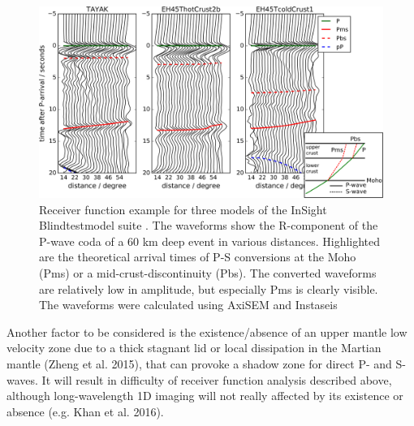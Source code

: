 \begin{figure}[h!]
\begin{center}
\includegraphics[width=1.0\textwidth]
{figures/Fig_waveforms.png}
\caption{Receiver function example for three models of the InSight Blindtestmodel suite \citep{Clinton2017}. The waveforms show the R-component of the P-wave coda of a 60 km deep event in various distances. Highlighted are the theoretical arrival times of P-S conversions at the Moho (Pms) or a mid-crust-discontinuity (Pbs). The converted waveforms are relatively low in amplitude, but especially Pms is clearly visible. The waveforms were calculated using AxiSEM and Instaseis \citep{Nissen-Meyer2014, VanDriel2015}}
\label{fig:waveform.png} 
\end{center}
\end{figure} 


Another factor to be considered is the existence/absence of an upper mantle low velocity zone due to a thick stagnant lid or local dissipation in the Martian mantle (Zheng et al. 2015), that can provoke a shadow zone for direct P- and S-waves. It will result in difficulty of receiver function analysis described above, although long-wavelength 1D imaging will not really affected by its existence or absence (e.g. Khan et al. 2016).


